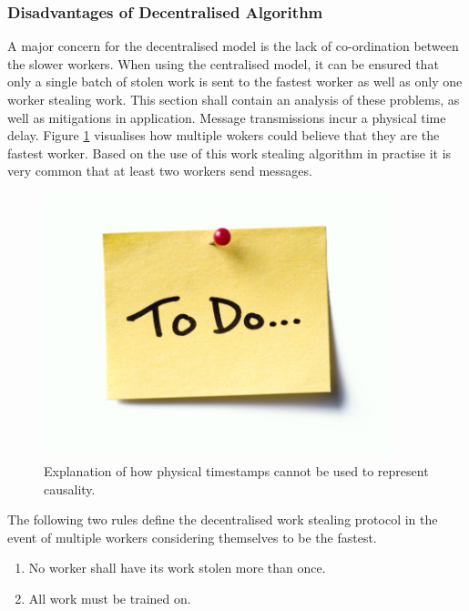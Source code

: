 \documentclass[12pt]{article}
\begin{document}
\subsubsection{Disadvantages of Decentralised Algorithm}
A major concern for the decentralised model is the lack of co-ordination between the slower workers. When using the centralised model, it can be ensured that only a single batch of stolen work is sent to the fastest worker as well as only one worker stealing work. This section shall contain an analysis of these problems, as well as mitigations in application.
\newline
Message transmissions incur a physical time delay. Figure \ref{messageInterleave} visualises how multiple wokers could believe that they are the fastest worker. Based on the use of this work stealing algorithm in practise it is very common that at least two workers send  messages.

\begin{figure}[H]
  \centering
  \includegraphics[width=4in]{todo}
  \caption[]{Explanation of how physical timestamps cannot be used to represent causality.}
  \label{messageInterleave}
\end{figure}

The following two rules define the decentralised work stealing protocol in the event of multiple workers considering themselves to be the fastest.

\begin{enumerate}
\item No worker shall have its work stolen more than once.
\item All work must be trained on.
\end{enumerate}
\end{document}

